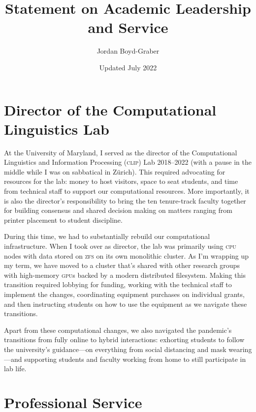 \documentclass[11pt]{amsart}
\newcommand{\abr}[1]{\textsc{#1}}
\begin{document}
 \title{Statement on Academic Leadership and Service}

 \author{Jordan Boyd-Graber}
\address{University of Maryland}

\date{Updated July 2022}


\keywords{}

\maketitle

\section{Director of the Computational Linguistics Lab}

At the University of Maryland, I served as the director of the
Computational Linguistics and Information Processing (\abr{clip}) Lab
2018--2022 (with a pause in the middle while I was on sabbatical in
Z\"urich).
%
This required advocating for resources for the lab: money to host
visitors, space to seat students, and time from technical staff to
support our computational resources.
%
More importantly, it is also the director's responsibility to bring
the ten tenure-track faculty together for building consensus and shared
decision making on matters ranging from printer placement to student
discipline.

During this time, we had to substantially rebuild our computational
infrastructure.
%
When I took over as director, the lab was primarily using \abr{cpu}
nodes with data stored on \abr{zfs} on its own monolithic cluster.
%
As I'm wrapping up my term, we have moved to a cluster that's shared
with other research groups with high-memory \abr{gpu}s backed by a
modern distributed filesystem.
%
Making this transition required lobbying for funding, working with the
technical staff to implement the changes, coordinating equipment
purchases on individual grants, and then instructing students
on how to use the equipment as we navigate these transitions.

Apart from these computational changes, we also navigated the
pandemic's transitions from fully online to hybrid interactions:
exhorting students to follow the university's guidance---on everything
from social distancing and mask wearing---and supporting students and
faculty working from home to still participate in
lab life.

\section{Professional Service}
\end{document}
